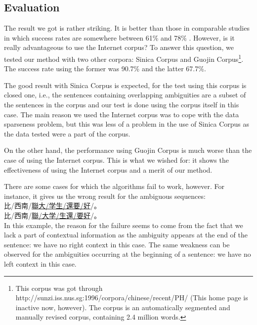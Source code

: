 {\subsection{Evaluation}
\label{evaluate}

The result we got is rather striking. It is better than those in comparable studies in which success rates are somewhere between 61\% and 78\% \cite{Sun99}. However, is it really advantageous to use the Internet corpus? To answer this question, we tested our method with two other corpora: Sinica Corpus and Guojin Corpus\footnote{This corpus was got through http://sunzi.iss.nus.sg:1996/corpora/chinese/recent/PH/  (This home page is inactive now, however). The corpus is an automatically segmented and manually revised corpus, containing 2.4 million words.
}. The success rate using the former was 90.7\% and the latter 67.7\%.

The good result with Sinica Corpus is expected, for the test using this corpus is closed one, i.e., the sentences containing overlapping ambiguities are a subset of the sentences in the corpus and our test is done using the corpus itself in this case. The main reason we used the Internet corpus was to cope with the data sparseness problem, but this was less of a problem in the use of Sinica Corpus as  the data tested were a part of the corpus.

On the other hand, the performance using Guojin Corpus is much worse than the case of using the Internet corpus. This is what we wished for: it shows the effectiveness of using the Internet corpus and a merit of our method.

There are some cases for which the algorithms fail to work, however. For instance, it gives us the wrong result for the ambiguous sequences:\\
\hspace*{3zw}       {\small 比}/{\small 西南}/\underline{{\small 聯大}/{\small 学生}/{\small 還要}/{\small 好}}/{\small 。}\\
\hspace*{3zw}       {\small 比}/{\small 西南}/\underline{{\small 聯}/{\small 大学}/{\small 生還}/{\small 要好}}/{\small 。}\\
In this example, the reason for the failure seems to come from the fact that we lack a part of contextual information as the ambiguity appears at the end of the sentence: we have no right context in this case. The same weakness can be observed for the ambiguities occurring at the beginning of a sentence: we have no left context in this case.

}
